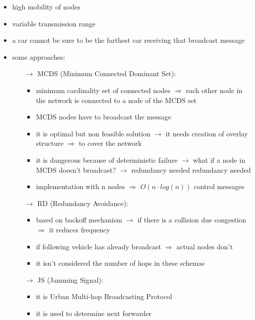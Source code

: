 \begin{itemize}
    \item high mobility of nodes
    \item variable transmission range
    \item a car cannot be sure to be the farthest car receiving that broadcast message
    \item some approaches:
    \begin{itemize}
        \item[$\rightarrow$] MCDS (Minimum Connected Dominant Set):
        \begin{itemize}
            \item minimum cardinality set of connected nodes $\Rightarrow$ each
            other node in the network is connected to a node of the MCDS set
            \item MCDS nodes have to broadcast the message
            \item it is optimal but non feasible solution $\rightarrow$
            it needs creation of overlay\\structure $\Rightarrow$ to cover the network
            \item it is dangerous because of deterministic failure
            $\rightarrow$ what if a node in MCDS doesn't broadcast? $\rightarrow$ redundancy needed
            redundancy needed
            \item implementation with n nodes $\Rightarrow$ $O(n \cdot
            log(n))$ control messages
        \end{itemize}
        \item[$\rightarrow$] RD (Redundancy Avoidance):
        \begin{itemize}
            \item based on backoff mechanism $\rightarrow$ if there is a
            collision due congestion $\Rightarrow$ it reduces frequency
            \item if following vehicle has already broadcast $\Rightarrow$ actual
            nodes don't
            \item it isn't considered the number of hops in these schemas
        \end{itemize}
        \item[$\rightarrow$] JS (Jamming Signal):
        \begin{itemize}
            \item it is Urban Multi-hop Broadcasting Protocol
            \item it is used to determine next forwarder

\end{itemize}
\end{itemize}
\end{itemize}
